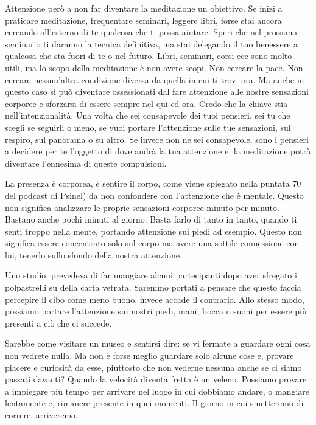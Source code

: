 \documentclass[12pt]{book} %
\begin{document}
Attenzione però a non far diventare la meditazione un obiettivo. Se inizi a praticare meditazione, frequentare seminari,
leggere libri, forse stai ancora cercando all'esterno di te qualcosa che ti
possa aiutare. Speri che nel prossimo seminario ti daranno la tecnica definitiva, ma stai delegando il tuo benessere a
qualcosa che sta fuori di te o nel futuro. Libri, seminari, corsi ecc sono molto utili, ma lo
scopo della meditazione è non avere scopi. Non cercare la pace. Non cercare nessun'altra
condizione diversa da quella in cui ti trovi ora. Ma anche in questo caso si può diventare ossessionati dal fare
attenzione alle nostre sensazioni corporee e sforzarsi di essere sempre nel qui ed ora. 
Credo che la chiave stia nell'intenzionalità. Una volta che sei
consapevole dei tuoi pensieri, sei tu che scegli se seguirli o meno, se vuoi portare l'attenzione
sulle tue sensazioni, sul respiro, sul panorama o su altro. Se invece non ne sei consapevole, sono i pensieri a
decidere per te l'oggetto di dove andrà la tua attenzione e, la meditazione potrà diventare l'ennesima di queste compulsioni.

La presenza è corporea, è sentire il corpo, come viene spiegato nella puntata
70 del podcast di Psinel) da non confondere con l'attenzione che è mentale. Questo non significa analizzare le proprie sensazioni corporee minuto
per minuto. Bastano anche pochi minuti al giorno. Basta farlo di tanto in tanto, quando ti senti troppo nella mente,
portando attenzione sui piedi ad esempio. Questo non significa essere concentrato solo sul corpo ma
avere una sottile connessione con lui, tenerlo sullo sfondo della nostra attenzione.

Uno studio, prevedeva di far mangiare alcuni partecipanti dopo aver sfregato i polpastrelli su della carta vetrata.
Saremmo portati a pensare che questo faccia percepire il cibo come meno buono, invece accade il contrario. Allo stesso
modo, possiamo portare l'attenzione sui nostri piedi, mani, bocca o suoni per essere più presenti a ciò che ci succede.

Sarebbe come visitare un museo e sentirsi dire: se vi fermate a guardare ogni cosa non vedrete nulla. Ma non è forse
meglio guardare solo alcune cose e, provare piacere e curiosità da esse, piuttosto che non vederne nessuna anche se ci
siamo passati davanti? Quando la velocità diventa fretta è un veleno. Possiamo provare a impiegare più tempo per
arrivare nel luogo in cui dobbiamo andare, o mangiare lentamente e, rimanere presente in quei momenti. Il giorno in cui
smetteremo di correre, arriveremo.
\end{document}
